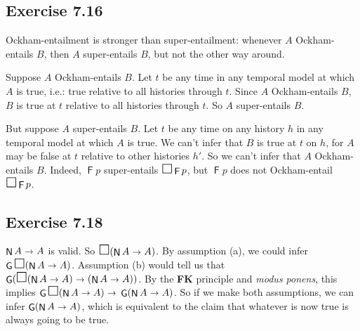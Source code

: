 \documentclass{scrartcl}
\let\oldbox\Box
\renewcommand\Box{\scaleobj{1.2}{\oldbox}}
\let\oldto\to
\renewcommand\to{\scaleobj{0.95}{\,\oldto\,}}
\DeclareMathOperator{\tF}{\mathsf{F}}
\DeclareMathOperator{\tG}{\mathsf{G}}
\DeclareMathOperator{\tN}{\mathsf{N}}
\begin{document}
  \subsection*{Exercise 7.16}

%
%
  Ockham-entailment is stronger than super-entailment: whenever $A$
  Ockham-entails $B$, then $A$ super-entails $B$, but not the other way around.

  Suppose $A$ Ockham-entails $B$. Let $t$ be any time in any temporal model at
  which $A$ is true, i.e.: true relative to all histories through $t$. Since $A$
  Ockham-entails $B$, $B$ is true at $t$ relative to all histories through
  $t$. So $A$ super-entails $B$.

  But suppose $A$ super-entails $B$. Let $t$ be any time on any history $h$ in
  any temporal model at which $A$ is true. We can't infer that $B$ is true at
  $t$ on $h$, for $A$ may be false at $t$ relative to other histories $h'$. So
  we can't infer that $A$ Ockham-entails $B$. Indeed, $\tF p$ super-entails
  $\Box \tF p$, but $\tF p$ does not Ockham-entail $\Box \tF p$.

  \subsection*{Exercise 7.18}

%
%
  $\tN A \to A$ is valid. So $\Box(\tN A \to A)$. By assumption (a),
  we could infer $\tG\Box(\tN A \to A)$. Assumption (b) would tell us
  that $\tG(\Box(\tN A \to A) \to (\tN A \to A))$. By the \textbf{FK}
  principle and \emph{modus ponens}, this implies
  $\tG\Box(\tN A \to A) \to \tG(\tN A \to A)$. So if we make both
  assumptions, we can infer $\tG(\tN A \to A)$, which is equivalent to
  the claim that whatever is now true is always going to be true.
\end{document}
